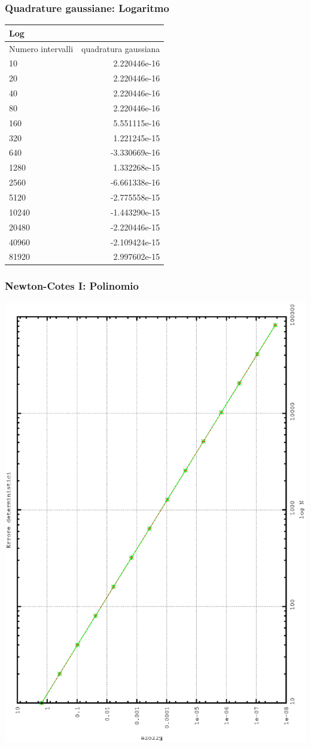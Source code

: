 \subsubsection{Quadrature gaussiane: Logaritmo}
\begin{center}
\begin{longtable}[h]{lr}
\toprule
Log & \\
\midrule
Numero intervalli & quadratura gaussiana \\
10 &	2.220446e-16 \\
20 &	2.220446e-16 \\
40 &	2.220446e-16 \\ 
80 &	2.220446e-16 \\
160 &	5.551115e-16 \\ 
320 & 	1.221245e-15 \\
640 &	-3.330669e-16 \\ 
1280 &	1.332268e-15 \\
2560 &	 -6.661338e-16 \\
5120 &	 -2.775558e-15 \\ 
10240 &	-1.443290e-15 \\ 
20480 &	 -2.220446e-15 \\
40960 &	 -2.109424e-15 \\ 
81920 &	2.997602e-15 \\
\midrule

\bottomrule
\end{longtable}
\end{center}
\subsubsection{Newton-Cotes I: Polinomio}
\begin{center}
\includegraphics[width=0.7\columnwidth,angle=-90]{plot_trap_poly.eps}
\end{center}

